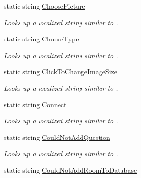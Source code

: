 \begin{DoxyCompactItemize}
static string \hyperlink{class_wis_r_1_1_app___resources_1_1_resource_a1effe30192b1e03f1da0b3e7ba29b736}{Choose\+Picture}
\begin{DoxyCompactList}\small\item\em Looks up a localized string similar to . \end{DoxyCompactList}\item 
static string \hyperlink{class_wis_r_1_1_app___resources_1_1_resource_a97be5e192b446314578549f36b348706}{Choose\+Type}
\begin{DoxyCompactList}\small\item\em Looks up a localized string similar to . \end{DoxyCompactList}\item 
static string \hyperlink{class_wis_r_1_1_app___resources_1_1_resource_a0db1256c09024323881d15243bc27cc9}{Click\+To\+Change\+Image\+Size}
\begin{DoxyCompactList}\small\item\em Looks up a localized string similar to . \end{DoxyCompactList}\item 
static string \hyperlink{class_wis_r_1_1_app___resources_1_1_resource_a0646173be977e0fabecdff30b7a47a74}{Connect}
\begin{DoxyCompactList}\small\item\em Looks up a localized string similar to . \end{DoxyCompactList}\item 
static string \hyperlink{class_wis_r_1_1_app___resources_1_1_resource_a1a21d3d4f7c9d1d35d5dcc64e638635a}{Could\+Not\+Add\+Question}
\begin{DoxyCompactList}\small\item\em Looks up a localized string similar to . \end{DoxyCompactList}\item 
static string \hyperlink{class_wis_r_1_1_app___resources_1_1_resource_ab3b7b9da5c085c7b3dac4ef5ab9d1be5}{Could\+Not\+Add\+Room\+To\+Database}

\end{DoxyCompactItemize}
